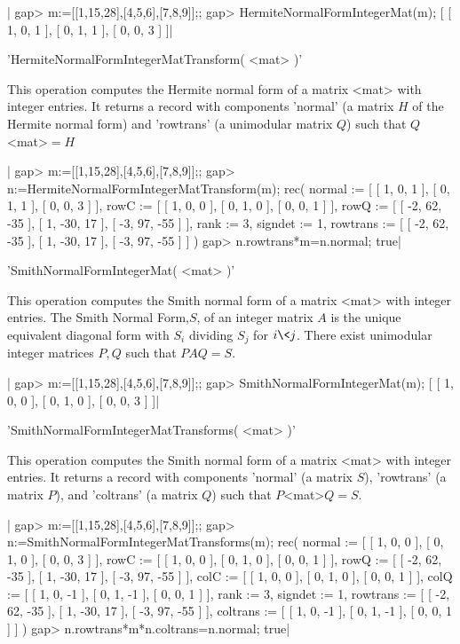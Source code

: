 |    gap> m:=[[1,15,28],[4,5,6],[7,8,9]];;
    gap> HermiteNormalFormIntegerMat(m);
    [ [ 1, 0, 1 ], [ 0, 1, 1 ], [ 0, 0, 3 ] ]|

'HermiteNormalFormIntegerMatTransform( <mat> )'

This  operation computes  the Hermite  normal form  of a  matrix <mat> with
integer entries. It returns a record with components 'normal' (a matrix $H$
of  the Hermite normal form) and  'rowtrans' (a unimodular matrix $Q$) such
that $Q$<mat>$=H$

|    gap> m:=[[1,15,28],[4,5,6],[7,8,9]];;
    gap> n:=HermiteNormalFormIntegerMatTransform(m);
    rec( normal := [ [ 1, 0, 1 ], [ 0, 1, 1 ], [ 0, 0, 3 ] ],
      rowC := [ [ 1, 0, 0 ], [ 0, 1, 0 ], [ 0, 0, 1 ] ],
      rowQ := [ [ -2, 62, -35 ], [ 1, -30, 17 ], [ -3, 97, -55 ] ], rank := 3,
      signdet := 1,
      rowtrans := [ [ -2, 62, -35 ], [ 1, -30, 17 ], [ -3, 97, -55 ] ] )
    gap> n.rowtrans*m=n.normal;
    true|

'SmithNormalFormIntegerMat( <mat> )'

This  operation  computes  the  Smith  normal  form  of a matrix <mat> with
integer entries. The Smith Normal Form,$S$, of an integer matrix $A$ is the
unique  equivalent diagonal  form with  $S_i$ dividing  $S_j$ for $i \< j$.
There exist unimodular integer matrices $P, Q$ such that $PAQ = S.$

|    gap> m:=[[1,15,28],[4,5,6],[7,8,9]];;
    gap> SmithNormalFormIntegerMat(m);
    [ [ 1, 0, 0 ], [ 0, 1, 0 ], [ 0, 0, 3 ] ]|

'SmithNormalFormIntegerMatTransforms( <mat> )'

This  operation  computes  the  Smith  normal  form  of a matrix <mat> with
integer  entries. It  returns a  record with  components 'normal' (a matrix
$S$),  'rowtrans' (a matrix  $P$), and 'coltrans'  (a matrix $Q$) such that
$P$<mat>$Q=S$.

|    gap> m:=[[1,15,28],[4,5,6],[7,8,9]];;
    gap> n:=SmithNormalFormIntegerMatTransforms(m);
    rec( normal := [ [ 1, 0, 0 ], [ 0, 1, 0 ], [ 0, 0, 3 ] ],
      rowC := [ [ 1, 0, 0 ], [ 0, 1, 0 ], [ 0, 0, 1 ] ],
      rowQ := [ [ -2, 62, -35 ], [ 1, -30, 17 ], [ -3, 97, -55 ] ],
      colC := [ [ 1, 0, 0 ], [ 0, 1, 0 ], [ 0, 0, 1 ] ],
      colQ := [ [ 1, 0, -1 ], [ 0, 1, -1 ], [ 0, 0, 1 ] ], rank := 3,
      signdet := 1,
      rowtrans := [ [ -2, 62, -35 ], [ 1, -30, 17 ], [ -3, 97, -55 ] ],
      coltrans := [ [ 1, 0, -1 ], [ 0, 1, -1 ], [ 0, 0, 1 ] ] )
    gap> n.rowtrans*m*n.coltrans=n.normal;
    true|

